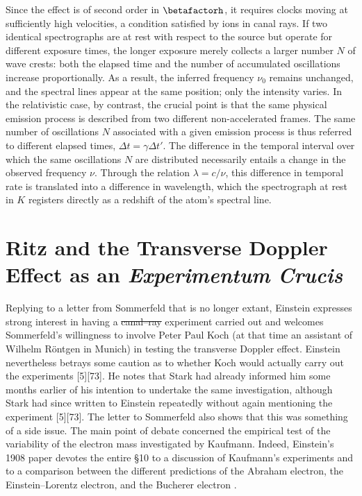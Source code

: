\documentclass[pdflatex]{sn-jnl} %
\newcommand{\tDe}{transverse Doppler effect\xspace}
\providecommand{\DIFadd}[1]{{\protect\color{blue}\uwave{#1}}} %
\providecommand{\DIFdel}[1]{{\protect\color{red}\sout{#1}}}                      %
\providecommand{\DIFaddbegin}{} %
\providecommand{\DIFaddend}{} %
\providecommand{\DIFdelbegin}{} %
\providecommand{\DIFdelend}{} %
\begin{document}
Since the effect is of second order in $\betafactorh$, it requires clocks moving at sufficiently high velocities, a condition satisfied by ions in canal rays. If two identical spectrographs are at rest with respect to the source but operate for different exposure times, the longer exposure merely collects a larger number $N$ of wave crests: both the elapsed time and the number of accumulated oscillations increase proportionally. As a result, the inferred frequency $\nu_0$ remains unchanged, and the spectral lines appear at the same position; only the intensity varies. In the relativistic case, by contrast, the crucial point is that the same physical emission process is described from two different non-accelerated frames. The same number of oscillations $N$ associated with a given emission process is thus referred to different elapsed times, $\Delta t=\gamma \Delta t'$. The difference in the temporal interval over which the same oscillations $N$ are distributed necessarily entails a change in the observed frequency $\nu$. Through the relation $\lambda = c/\nu$, this difference in temporal rate is translated into a difference in wavelength, which the spectrograph at rest in $K$ registers directly as a redshift of the atom’s spectral line.


\section{Ritz and the Transverse Doppler Effect as an \emph{Experimentum Crucis}}
%
Replying to a letter from Sommerfeld that is no longer extant, Einstein expresses strong interest in having a \DIFdelbegin \DIFdel{canal--ray }\DIFdelend \DIFaddbegin \DIFadd{canal-ray }\DIFaddend experiment carried out and welcomes Sommerfeld’s willingness to involve Peter Paul Koch (at that time an assistant of Wilhelm Röntgen in Munich) in testing the \tDe. Einstein nevertheless betrays some caution as to whether Koch would actually carry out the experiments [5][73]. He notes that Stark had already informed him some months earlier of his intention to undertake the same investigation, although Stark had since written to Einstein repeatedly without again mentioning the experiment [5][73]. The letter to Sommerfeld also shows that this was something of a side issue. The main point of debate concerned the empirical test of the variability of the electron mass investigated by Kaufmann. Indeed, Einstein’s 1908 paper devotes the entire \S10 to a discussion of Kaufmann’s experiments and to a comparison between the different predictions of the Abraham electron, the Einstein--Lorentz electron, and the Bucherer electron \citep{Walter2018}.
\end{document}
